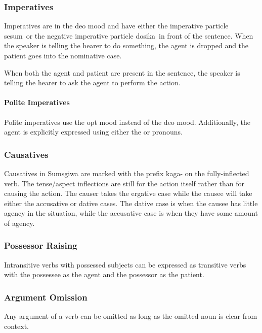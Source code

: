 \subsubsection{Imperatives} \label{04_03_03_Imperatives}
Imperatives are in the \acrlong{deo} mood and have either the imperative particle \textlangle sesum\textrangle~or the negative imperative particle \textlangle dosika\textrangle~in front of the sentence. When the speaker is telling the hearer to do something, the agent is dropped and the patient goes into the nominative case.

When both the agent and patient are present in the sentence, the speaker is telling the hearer to ask the agent to perform the action.

\paragraph{Polite Imperatives}
Polite imperatives use the \acrlong{opt} mood instead of the \acrlong{deo} mood. Additionally, the agent is explicitly expressed using either the  or  pronouns.

\subsubsection{Causatives}
Causatives in Sumsgiwa are marked with the prefix \textlangle kaga\textrangle- on the fully-inflected verb. The tense/aspect inflections are still for the action itself rather than for causing the action. The causer takes the ergative case while the causee will take either the accusative or dative cases. The dative case is when the causee has little agency in the situation, while the accusative case is when they have some amount of agency.

\subsubsection{Possessor Raising}
Intransitive verbs with possessed subjects can be expressed as transitive verbs with the possessee as the agent and the possessor as the patient.

\subsubsection{Argument Omission}
Any argument of a verb can be omitted as long as the omitted noun is clear from context.

